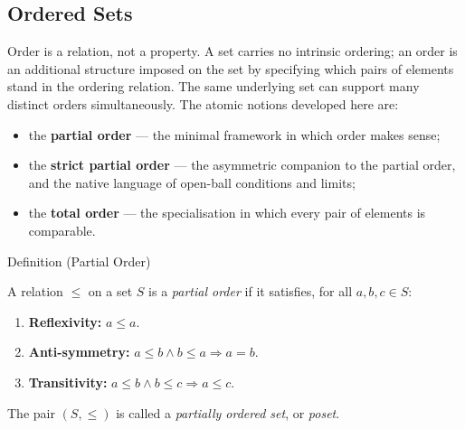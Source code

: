 
\subsection{Ordered Sets}
\label{sec:ordered-sets}

\begin{remark*}
Order is a relation, not a property.  A set carries no intrinsic ordering;
an order is an additional structure imposed on the set by specifying which
pairs of elements stand in the ordering relation.  The same underlying set
can support many distinct orders simultaneously.  The atomic notions
developed here are:
\begin{itemize}
  \item the \textbf{partial order} --- the minimal framework in which order
        makes sense;
  \item the \textbf{strict partial order} --- the asymmetric companion to the
        partial order, and the native language of open-ball conditions and
        limits;
  \item the \textbf{total order} --- the specialisation in which every pair of
        elements is comparable.
\end{itemize}
\end{remark*}


\begin{definitionbox}{Definition (Partial Order)}
\begin{definition}
\label{def:lattice-order-partial-order}
A relation $\leq$ on a set $S$ is a \emph{partial order} if it satisfies,
for all $a, b, c \in S$:
\begin{enumerate}
  \item \textbf{Reflexivity:} $a \leq a$.
  \item \textbf{Anti-symmetry:} $a \leq b \land b \leq a \Longrightarrow a = b$.
  \item \textbf{Transitivity:} $a \leq b \land b \leq c \Longrightarrow a \leq c$.
\end{enumerate}
The pair $(S, \leq)$ is called a \emph{partially ordered set}, or \emph{poset}.
\end{definition}
\end{definitionbox}

